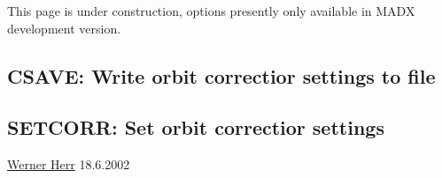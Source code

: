 

 This page is under construction, options presently only available in MADX development version.  



\subsection{CSAVE: Write orbit correctior settings to file}

\subsection{SETCORR: Set orbit correctior settings}

\href{http://consult.cern.ch/xwho/people/1808}{Werner Herr} 18.6.2002 

